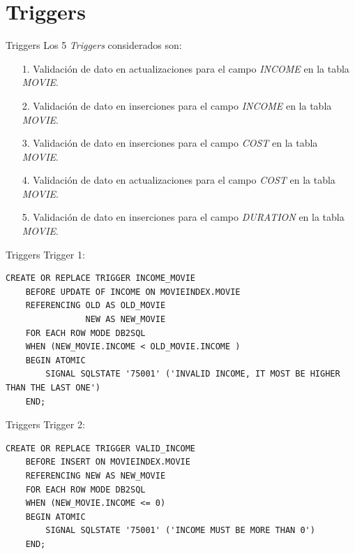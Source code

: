 \documentclass{beamer}%
\begin{document}
\section{Triggers}

\begin{frame}{Triggers}
Los 5 \textit{Triggers} considerados son:
\begin{itemize}
\item[1.]Validaci\'on de dato en actualizaciones para el campo \textit{INCOME} en la tabla \textit{MOVIE}.
\item[2.]Validaci\'on de dato en inserciones para el campo \textit{INCOME} en la tabla \textit{MOVIE}.
\item[3.]Validaci\'on de dato en inserciones para el campo \textit{COST} en la tabla \textit{MOVIE}.
\item[4.]Validaci\'on de dato en actualizaciones para el campo \textit{COST} en la tabla \textit{MOVIE}.
\item[5.]Validaci\'on de dato en inserciones para el campo \textit{DURATION} en la tabla \textit{MOVIE}.

\end{itemize}

\end{frame}


\begin{frame}[fragile]{Triggers}
Trigger 1:
\begin{tiny}
\begin{verbatim}
CREATE OR REPLACE TRIGGER INCOME_MOVIE
    BEFORE UPDATE OF INCOME ON MOVIEINDEX.MOVIE
    REFERENCING OLD AS OLD_MOVIE
                NEW AS NEW_MOVIE
    FOR EACH ROW MODE DB2SQL
    WHEN (NEW_MOVIE.INCOME < OLD_MOVIE.INCOME )
    BEGIN ATOMIC
        SIGNAL SQLSTATE '75001' ('INVALID INCOME, IT MOST BE HIGHER THAN THE LAST ONE')
    END;
\end{verbatim}
\end{tiny}
\end{frame}

\begin{frame}[fragile]{Triggers}
Trigger 2:
\begin{tiny}
\begin{verbatim}
CREATE OR REPLACE TRIGGER VALID_INCOME
    BEFORE INSERT ON MOVIEINDEX.MOVIE
    REFERENCING NEW AS NEW_MOVIE
    FOR EACH ROW MODE DB2SQL
    WHEN (NEW_MOVIE.INCOME <= 0)
    BEGIN ATOMIC
        SIGNAL SQLSTATE '75001' ('INCOME MUST BE MORE THAN 0')
    END;
\end{verbatim}
\end{tiny}
\end{frame}
\end{document}
